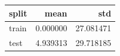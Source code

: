 \begin{tabular}{lrr}
\toprule
split & mean & std \\
\midrule
train & 0.000000 & 27.081471 \\
test & 4.939313 & 29.718185 \\
\bottomrule
\end{tabular}
